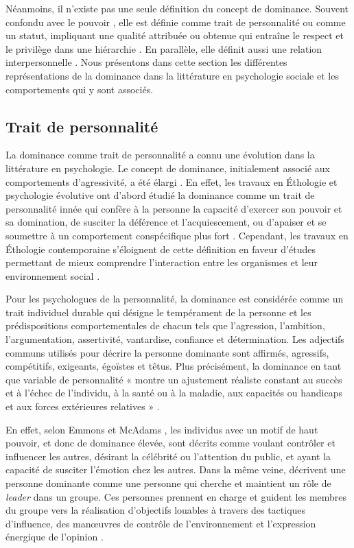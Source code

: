 		Néanmoins, il n'existe pas une seule définition du concept de dominance. Souvent confondu avec le pouvoir  \cite{burgoon2000interactionist,dunbar2005perceptions}, elle est définie comme trait de personnalité ou comme un statut, impliquant une qualité attribuée ou obtenue qui entraîne le respect et le privilège dans une hiérarchie \cite{hall2005nonverbal}. En parallèle, elle définit aussi une relation interpersonnelle \cite{burgoon2006nonverbal,burgoon1998nature}. Nous présentons dans cette section les différentes représentations de la dominance dans la littérature en psychologie sociale et les comportements qui y sont associés.  
		
	\subsection{Trait de personnalité}
		La dominance comme trait de personnalité a connu une évolution dans la littérature en psychologie. Le concept de dominance, initialement associé aux comportements d'agressivité, a été élargi \cite{burgoon1995interpersonal}.
		En effet, les travaux en Éthologie et psychologie évolutive ont d'abord étudié la dominance comme un trait de personnalité innée qui confère à la personne la capacité d'exercer son pouvoir et sa domination, de susciter la déférence et l'acquiescement, ou d'apaiser et se soumettre à un comportement conspécifique plus fort \cite{keltner1995signs,burgoon2006nonverbal}. Cependant, les travaux en Éthologie contemporaine s'éloignent de cette définition en faveur d'études permettant de mieux comprendre l'interaction entre les organismes et leur environnement social \cite{burgoon2006nonverbal}.
		
		Pour les psychologues de la personnalité, la dominance est considérée comme un trait individuel durable qui désigne le tempérament de la personne et les prédispositions comportementales de chacun \cite{cattell1970handbook,ridgeway1987nonverbal} tels que l'agression, l'ambition, l'argumentation, assertivité, vantardise, confiance et détermination.
		Les adjectifs communs utilisés pour décrire la personne dominante sont affirmés, agressifs, compétitifs, exigeants, égoïstes et têtus. Plus précisément, la dominance en tant que variable de personnalité « montre un ajustement réaliste constant au succès et à l'échec de l'individu, à la santé ou à la maladie, aux capacités ou handicaps et aux forces extérieures relatives » \cite{cattell1970handbook,burgoon1998nature}.
		
		En effet, selon  Emmons et McAdams \cite{emmons1991personal}, les individus avec un motif de haut pouvoir, et donc de dominance élevée, sont décrits comme voulant contrôler et influencer les autres, désirant la célébrité ou l'attention du public, et ayant la capacité de susciter l'émotion chez les autres. Dans la même veine, \cite{jackson1974personality} décrivent une personne dominante comme une personne qui cherche et maintient un rôle de \textit{leader} dans un groupe. Ces personnes prennent en charge et guident les membres du groupe vers la réalisation d'objectifs louables à travers des tactiques d'influence, des manœuvres de contrôle de l'environnement et l'expression énergique de l'opinion \cite{burgoon1998nature}. 
	
